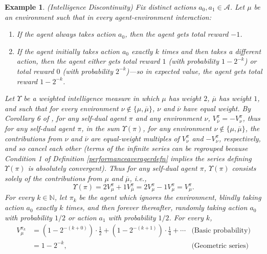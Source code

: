 \documentclass[twoside]{article}
\newtheorem{example}[theorem]{Example}
\begin{document}
\begin{example}
    (Intelligence Discontinuity)
    Fix distinct actions $a_0,a_1\in\mathcal A$.
    Let $\mu$ be an environment such that in every agent-environment interaction:
    \begin{enumerate}
        \item If the agent always takes action $a_0$, then the agent gets total reward $-1$.
        \item If the agent initially takes action $a_0$ exactly $k$ times and
            then takes a different action, then the agent either
            gets total reward $1$ (with probability $1-2^{-k}$)
            or total reward $0$ (with probability $2^{-k}$)---so in expected
            value, the agent gets total reward $1-2^{-k}$.
    \end{enumerate}
    Let $\Upsilon$ be a weighted intelligence measure in which $\mu$ has weight $2$,
    $\overline\mu$ has weight $1$, and such that for every
    environment $\nu\not\in\{\mu,\overline{\mu}\}$, $\nu$ and $\overline{\nu}$ have
    equal weight.
    By Corollary 6 of \cite{alexander2021reward}, for any self-dual agent $\pi$ and
    any environment $\nu$, $V^\pi_{\overline\nu}=-V^\pi_{\nu}$, thus for any
    self-dual agent $\pi$,
    in the sum $\Upsilon(\pi)$, for any environment $\nu\not\in\{\mu,\overline{\mu}\}$,
    the contributions from $\nu$ and $\overline\nu$ are equal-weight multiples of
    $V^\pi_{\nu}$ and $-V^\pi_{\nu}$,
    respectively, and so cancel each other
    (terms of the infinite series can be regrouped because
    Condition 1 of Definition \ref{performanceaveragerdefn} implies
    the series defining $\Upsilon(\pi)$ is absolutely convergent).
    Thus for any self-dual agent $\pi$,
    $\Upsilon(\pi)$ consists solely of the contributions from $\mu$ and $\overline\mu$,
    i.e.,
    \[
        \Upsilon(\pi)=2V^\pi_\mu+1V^\pi_{\overline\mu}
        =2V^\pi_\mu-1V^\pi_{\mu}=V^\pi_\mu.
    \]
    For every $k\in\mathbb N$, let $\pi_k$ be the agent which ignores the environment,
    blindly taking action $a_0$ exactly $k$ times, and then forever thereafter,
    randomly taking action $a_0$ with probability $1/2$ or action $a_1$ with probability
    $1/2$.
    For every $k$,
    \begin{align*}
        V^{\pi_k}_\mu
            &= (1-2^{-(k+0)})\cdot \mbox{$\frac12$}
                +(1-2^{-(k+1)})\cdot\mbox{$\frac14$} + \cdots
                    &\mbox{(Basic probability)}\\
            &= 1-2^{-k},
                    &\mbox{(Geometric series)}

\end{align*}
\end{example}
\end{document}
